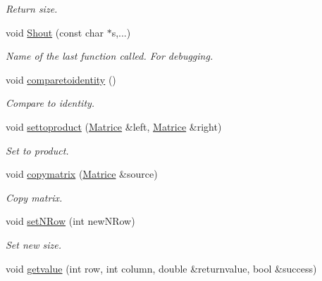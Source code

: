 \begin{DoxyCompactItemize}
\begin{DoxyCompactList}\small\item\em Return size. \end{DoxyCompactList}\item 
void \hyperlink{classMatrice_ac11429f7ec42e6eb4806e77f8aa24e7f}{Shout} (const char $\ast$s,...)\hypertarget{classMatrice_ac11429f7ec42e6eb4806e77f8aa24e7f}{}\label{classMatrice_ac11429f7ec42e6eb4806e77f8aa24e7f}

\begin{DoxyCompactList}\small\item\em Name of the last function called. For debugging. \end{DoxyCompactList}\item 
void \hyperlink{classMatrice_a15f367c26198d2a68e87dd0881771a47}{comparetoidentity} ()\hypertarget{classMatrice_a15f367c26198d2a68e87dd0881771a47}{}\label{classMatrice_a15f367c26198d2a68e87dd0881771a47}

\begin{DoxyCompactList}\small\item\em Compare to identity. \end{DoxyCompactList}\item 
void \hyperlink{classMatrice_a71879f4bca600c787f6509d381a18898}{settoproduct} (\hyperlink{classMatrice}{Matrice} \&left, \hyperlink{classMatrice}{Matrice} \&right)\hypertarget{classMatrice_a71879f4bca600c787f6509d381a18898}{}\label{classMatrice_a71879f4bca600c787f6509d381a18898}

\begin{DoxyCompactList}\small\item\em Set to product. \end{DoxyCompactList}\item 
void \hyperlink{classMatrice_acf5a1b0b528030fe0eee6182757c05de}{copymatrix} (\hyperlink{classMatrice}{Matrice} \&source)\hypertarget{classMatrice_acf5a1b0b528030fe0eee6182757c05de}{}\label{classMatrice_acf5a1b0b528030fe0eee6182757c05de}

\begin{DoxyCompactList}\small\item\em Copy matrix. \end{DoxyCompactList}\item 
void \hyperlink{classMatrice_a26e611b77062b246d913c6038ea86189}{set\+N\+Row} (int new\+N\+Row)\hypertarget{classMatrice_a26e611b77062b246d913c6038ea86189}{}\label{classMatrice_a26e611b77062b246d913c6038ea86189}

\begin{DoxyCompactList}\small\item\em Set new size. \end{DoxyCompactList}\item 
void \hyperlink{classMatrice_a2b7ffed3a15b7b2ff089b751c3588b4a}{getvalue} (int row, int column, double \&returnvalue, bool \&success)\hypertarget{classMatrice_a2b7ffed3a15b7b2ff089b751c3588b4a}{}\label{classMatrice_a2b7ffed3a15b7b2ff089b751c3588b4a}


\end{DoxyCompactItemize}
